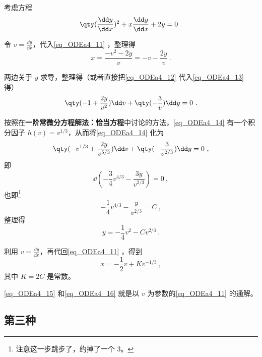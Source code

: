 \begin{example}{}
考虑方程
\begin{equation}\label{eq_ODEa4_11}
\qty(\frac{\dd y}{\dd x})^2+x\frac{\dd y}{\dd x}+2y=0~.
\end{equation}

令 $v=\frac{\dd y}{\dd x}$，代入\autoref{eq_ODEa4_11} ，整理得
\begin{equation}\label{eq_ODEa4_12}
x=\frac{-v^2-2y}{v}=-v-\frac{2y}{v}~.
\end{equation}



两边关于 $y$ 求导，整理得（或者直接把\autoref{eq_ODEa4_12} 代入\autoref{eq_ODEa4_13} 得）
\begin{equation}\label{eq_ODEa4_14}
\qty(-1+\frac{2y}{v^2})\dd v+\qty(-\frac{3}{v})\dd y=0~.
\end{equation}

按照在\textbf{一阶常微分方程解法：恰当方程}中讨论的方法，\autoref{eq_ODEa4_14} 有一个积分因子 $h(v)=v^{1/3}$，从而将\autoref{eq_ODEa4_14} 化为
\begin{equation}
\qty(-v^{1/3}+\frac{2y}{v^{5/3}})\dd v+\qty(-\frac{3}{v^{2/3}})\dd y=0~,
\end{equation}
即
\begin{equation}
\dd (-\frac{3}{4}v^{4/3}-\frac{3y}{v^{2/3}})=0~,
\end{equation}
也即\footnote{注意这一步跳步了，约掉了一个 $3$。}
\begin{equation}
-\frac{1}{4}v^{4/3}-\frac{y}{v^{2/3}}=C~,
\end{equation}
整理得
\begin{equation}\label{eq_ODEa4_15}
y=-\frac{1}{4}v^2-Cv^{2/3}~.
\end{equation}

利用 $v=\frac{\dd y}{\dd x}$，再代回\autoref{eq_ODEa4_11} ，得到
\begin{equation}\label{eq_ODEa4_16}
x=-\frac{1}{2}v+Kv^{-1/3}~,
\end{equation}
其中 $K=2C$ 是常数。

\autoref{eq_ODEa4_15} 和\autoref{eq_ODEa4_16} 就是以 $v$ 为参数的\autoref{eq_ODEa4_11} 的通解。



\end{example}



\subsection{第三种}

